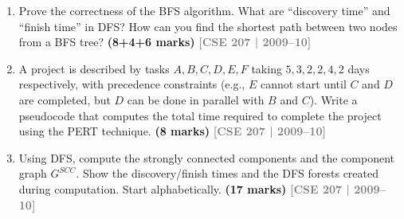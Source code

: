 \documentclass[12pt,a3paper]{article}
\newcommand{\yr}[1]{\hfill\textcolor{gray}{\small\textbf{[#1]}}}
\newcommand{\mk}[1]{\textcolor{orange!70!black}{\small\textbf{(#1 marks)}}}
\begin{document}
\begin{enumerate}
\item Prove the correctness of the BFS algorithm. What are ``discovery time'' and ``finish time'' in DFS? How can you find the shortest path between two nodes from a BFS tree? \mk{8+4+6}
\yr{CSE 207 | 2009--10}

\item A project is described by tasks $A, B, C, D, E, F$ taking $5, 3, 2, 2, 4, 2$ days respectively, with precedence constraints (e.g., $E$ cannot start until $C$ and $D$ are completed, but $D$ can be done in parallel with $B$ and $C$). Write a pseudocode that computes the total time required to complete the project using the PERT technique. \mk{8}
\yr{CSE 207 | 2009--10}

\begin{center}

\end{center}

\item Using DFS, compute the strongly connected components and the component graph $G^{SCC}$. Show the discovery/finish times and the DFS forests created during computation. Start alphabetically. \mk{17}
\yr{CSE 207 | 2009--10}

\begin{center}


\end{center}
\end{enumerate}
\end{document}
